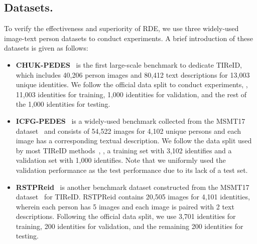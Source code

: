 \documentclass[10pt,twocolumn,letterpaper]{article}
\begin{document}
\subsection{Datasets.} To verify the effectiveness and superiority of RDE, we use three widely-used image-text person datasets to conduct experiments. A brief introduction of these datasets is given as follows:
\begin{itemize}
        \item \textbf{CHUK-PEDES}~\cite{li2017person} is the first large-scale benchmark to dedicate TIReID, which includes 40,206 person images and 80,412 text descriptions for 13,003 unique identities. We follow the official data split to conduct experiments, \ie, 11,003 identities for training, 1,000 identities for validation, and the rest of the 1,000 identities for testing.
        \item \textbf{ICFG-PEDES}~\cite{ding2021semantically} is a widely-used benchmark collected from the MSMT17 dataset~\cite{wei2018person} and consists of 54,522 images for 4,102 unique persons and each image has a corresponding textual description. We follow the data split used by most TIReID methods~\cite{shu2022see,jiang2023cross}, \ie, a training set with 3,102 identifies and a validation set with 1,000 identifies. Note that we uniformly used the validation performance as the test performance due to its lack of a test set.
        \item  \textbf{RSTPReid}~\cite{zhu2021dssl} is another benchmark dataset constructed from the MSMT17 dataset~\cite{wei2018person} for TIReID. RSTPReid contains 20,505 images for 4,101 identities, wherein each person has 5 images and each image is paired with 2 text descriptions. Following the official data split, we use 3,701 identities for training, 200 identities for validation, and the remaining 200 identities for testing.
\end{itemize}
\end{document}
